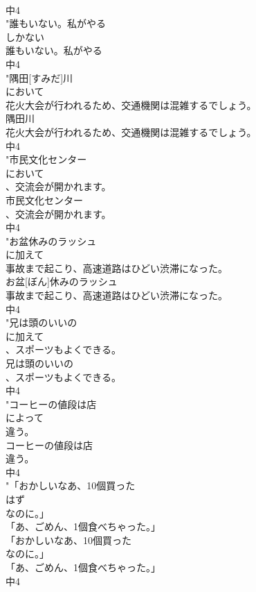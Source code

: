 \documentclass[8pt]{extreport}
\begin{document}
\begin{CJK}{UTF8}{min}
\\	中4
\\	"誰もいない。私がやる
\\	しかない
\\	誰もいない。私がやる
\\	中4
\\	"隅田[すみだ]川
\\	において
\\	花火大会が行われるため、交通機関は混雑するでしょう。
\\	隅田川
\\	花火大会が行われるため、交通機関は混雑するでしょう。
\\	中4
\\	"市民文化センター
\\	において
\\	、交流会が開かれます。
\\	市民文化センター
\\	、交流会が開かれます。
\\	中4
\\	"お盆休みのラッシュ
\\	に加えて
\\	事故まで起こり、高速道路はひどい渋滞になった。
\\	お盆[ぼん]休みのラッシュ
\\	事故まで起こり、高速道路はひどい渋滞になった。
\\	中4
\\	"兄は頭のいいの
\\	に加えて
\\	、スポーツもよくできる。
\\	兄は頭のいいの
\\	、スポーツもよくできる。
\\	中4
\\	"コーヒーの値段は店
\\	によって
\\	違う。
\\	コーヒーの値段は店
\\	違う。
\\	中4
\\	"「おかしいなあ、10個買った
\\	はず
\\	なのに。」
\\	「あ、ごめん、1個食べちゃった。」
\\	「おかしいなあ、10個買った
\\	なのに。」
\\	「あ、ごめん、1個食べちゃった。」
\\	中4

\end{CJK}
\end{document}
